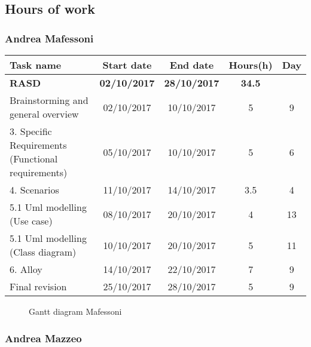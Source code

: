 \subsection{Hours of work}
\subsubsection{Andrea Mafessoni}

\begin{table}[h!]
	\begin{tabular}{lcccc}
		\toprule
		\textbf{Task name} & \textbf{Start date} & \textbf{End date} & \textbf{Hours(h)} & \textbf{Day} \\
		\midrule
		\textbf{RASD} & \textbf{02/10/2017} & \textbf{28/10/2017} & \textbf{34.5} &  \\
		Brainstorming and general overview & 02/10/2017 & 10/10/2017 & 5 & 9 \\
		3. Specific Requirements (Functional requirements) & 05/10/2017 & 10/10/2017 & 5 & 6 \\
		4. Scenarios & 11/10/2017 & 14/10/2017 & 3.5 & 4 \\
		5.1 Uml modelling (Use case) & 08/10/2017 & 20/10/2017 & 4 & 13 \\
		5.1 Uml modelling (Class diagram) & 10/10/2017 & 20/10/2017 & 5 & 11 \\
		6. Alloy & 14/10/2017 & 22/10/2017 & 7 & 9 \\
		\bottomrule
		Final revision & 25/10/2017 & 28/10/2017 & 5 & 9 \\
	\end{tabular}
\end{table}

\begin{figure}[!h]
	\centering
	\caption{Gantt diagram Mafessoni}
\end{figure}
\clearpage

\subsubsection{Andrea Mazzeo}

